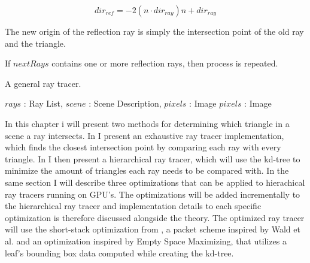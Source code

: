 \begin{displaymath}
  dir_{ref} = -2 (n \cdot dir_{ray}) n + dir_{ray}
\end{displaymath}

The new origin of the reflection ray is simply the intersection point of the old
ray and the triangle.

If $nextRays$ contains one or more reflection rays, then process is repeated.

\begin{algorithm}
  \caption{A general ray tracer.}
  \label{alg:generalRayTracer}
  \begin{algorithmic}
              {$rays$ : Ray List, $scene$ : Scene Description, $pixels$ : Image}
              {$pixels$ : Image}{
                  \ENDIF
                \ENDFOR
                \ENDIF
              }
  \end{algorithmic}
\end{algorithm}

In this chapter i will present two methods for determining which triangle in a
scene a ray intersects. In  I present an exhaustive
ray tracer implementation, which finds the closest intersection point by
comparing each ray with every triangle. In
 I then present a hierarchical ray tracer,
which will use the kd-tree to minimize the amount of triangles each ray needs to
be compared with. In the same section I will describe three optimizations that
can be applied to hierachical ray tracers running on GPU's. The optimizations
will be added incrementally to the hierarchical ray tracer and implementation
details to each specific optimization is therefore discussed alongside the
theory. The optimized ray tracer will use the short-stack optimization from
\horn, a packet scheme inspired by Wald et al. and an
optimization inspired by Empty Space Maximizing, that utilizes a leaf's bounding
box data computed while creating the kd-tree.

